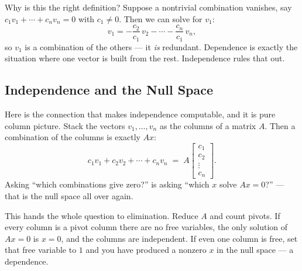 Why is this the right definition? Suppose a nontrivial combination vanishes, say $c_1 v_1 + \cdots + c_n v_n = 0$ with $c_1 \ne 0$. Then we can solve for $v_1$:
\[
   v_1 = -\frac{c_2}{c_1}\,v_2 - \cdots - \frac{c_n}{c_1}\,v_n,
\]
so $v_1$ is a combination of the others --- it \emph{is} redundant. Dependence is exactly the situation where one vector is built from the rest. Independence rules that out.


\subsection{Independence and the Null Space}

Here is the connection that makes independence computable, and it is pure column picture. Stack the vectors $v_1,\dots,v_n$ as the columns of a matrix $A$. Then a combination of the columns is exactly $Ax$:
\[
   c_1 v_1 + c_2 v_2 + \cdots + c_n v_n
   \;=\;
   A
   \begin{bmatrix} c_1 \\ c_2 \\ \vdots \\ c_n \end{bmatrix}.
\]
Asking ``which combinations give zero?'' is asking ``which $x$ solve $Ax=0$?'' --- that is the null space all over again.


This hands the whole question to elimination. Reduce $A$ and count pivots. If every column is a pivot column there are no free variables, the only solution of $Ax=0$ is $x=0$, and the columns are independent. If even one column is free, set that free variable to $1$ and you have produced a nonzero $x$ in the null space --- a dependence.

